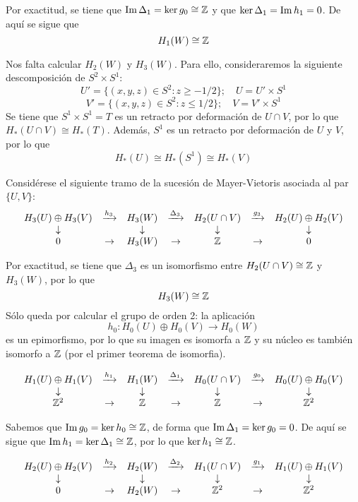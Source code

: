 Por exactitud, se tiene que $\operatorname{Im} \Delta_1=\ker g_0\cong \mathbb{Z}$ y que $\ker \Delta_1=\operatorname{Im} h_1=0$. De aquí se sigue que $$H_1(W)\cong \mathbb{Z}$$

Nos falta calcular $H_2(W)$ y $H_3(W)$. Para ello, consideraremos la siguiente descomposición de $S^2\times S^1$: \[U'=\{(x,y,z) \in S^2: z \geq -1/2\}; \quad U=U'\times S^1\] \[V'=\{(x,y,z) \in S^2: z \leq 1/2\}; \quad V=V'\times S^1\] Se tiene que $S^1\times S^1=T$ es un retracto por deformación de $U\cap V$, por lo que $H_*(U\cap V) \cong H_*(T)$. Además, $S^1$ es un retracto por deformación de $U$ y $V$, por lo que \[H_*(U) \cong H_*(S^1) \cong H_*(V)\]

Considérese el siguiente tramo de la sucesión de Mayer-Vietoris asociada al par $\{U,V\}$: \[\begin{array}{ccccccc}
H_3(U)\oplus H_3(V)	&\xrightarrow{h_3}	&H_3(W)		&\xrightarrow{\Delta_3}&H_2(U \cap V)&\xrightarrow{g_3}&H_2(U)\oplus H_2(V)\\
\downarrow			&					&\downarrow	&					&\downarrow & & \downarrow\\
0			&\rightarrow			&H_3(W)		&\rightarrow			&\mathbb{Z} & \rightarrow & 0
\end{array}\]

Por exactitud, se tiene que $\Delta_3$ es un isomorfismo entre $H_2(U\cap V) \cong \mathbb{Z}$ y $H_3(W)$, por lo que \[H_3(W)\cong \mathbb{Z}\] Sólo queda por calcular el grupo de orden 2: la aplicación $$h_0: H_0(U) \oplus H_0(V) \longrightarrow H_0(W)$$ es un epimorfismo, por lo que su imagen es isomorfa a $\mathbb{Z}$ y su núcleo es también isomorfo a $\mathbb{Z}$ (por el primer teorema de isomorfia).

\[\begin{array}{ccccccc}
H_1(U)\oplus H_1(V)	&\xrightarrow{h_1}	&H_1(W)&\xrightarrow{\Delta_1}&H_0(U\cap V)&\xrightarrow{g_0}&H_0(U) \oplus H_0(V)\\
\downarrow&		&\downarrow		&	&\downarrow & 	&\downarrow\\
\mathbb{Z}^2	& \rightarrow	&\mathbb{Z}	&\rightarrow	&\mathbb{Z} & \rightarrow & \mathbb{Z}^2	
\end{array}\]

Sabemos que $\operatorname{Im} g_0=\ker h_0 \cong \mathbb{Z}$, de forma que $\operatorname{Im} \Delta_1=\ker g_0=0$. De aquí se sigue que $\operatorname{Im} h_1=\ker \Delta_1\cong \mathbb{Z}$, por lo que $\ker h_1\cong \mathbb{Z}$. 

\[\begin{array}{ccccccc}
H_2(U)\oplus H_2(V)	&\xrightarrow{h_2}	&H_2(W)&\xrightarrow{\Delta_2}&H_1(U\cap V)&\xrightarrow{g_1}&H_1(U) \oplus H_1(V)\\
\downarrow&		&\downarrow		&	&\downarrow & 	&\downarrow\\
0& \rightarrow	&H_2(W)		&\rightarrow	&\mathbb{Z}^2 & \rightarrow & \mathbb{Z}^2	
\end{array}\]

